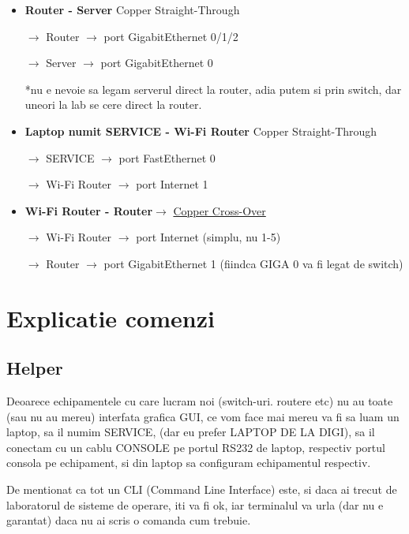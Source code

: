 \documentclass{article}
\begin{document}
\begin{itemize}
    

    



   
    \item \textbf{Router - Server} Copper Straight-Through

    $\rightarrow$ Router $\rightarrow$ port GigabitEthernet 0/1/2

    $\rightarrow$ Server $\rightarrow$ port GigabitEthernet 0

     *nu e nevoie sa legam serverul direct la router, adia putem si prin switch, dar uneori la lab se cere direct la router.

    \item \textbf{Laptop numit SERVICE - Wi-Fi Router} Copper Straight-Through

    $\rightarrow$ SERVICE $\rightarrow$ port FastEthernet 0

    $\rightarrow$ Wi-Fi Router $\rightarrow$ port Internet 1

    \item \textbf{Wi-Fi Router - Router}$\rightarrow$ \underline{Copper Cross-Over}

    $\rightarrow$ Wi-Fi Router $\rightarrow$ port Internet (simplu, nu 1-5)

    $\rightarrow$ Router $\rightarrow$ port GigabitEthernet 1 (fiindca GIGA 0 va fi legat de switch)
\end{itemize}

\section{Explicatie comenzi}



\subsection{Helper}
Deoarece echipamentele cu care lucram noi (switch-uri. routere etc) nu au toate (sau nu au mereu) interfata grafica GUI, ce vom face mai mereu va fi sa luam un laptop, sa il numim SERVICE, (dar eu prefer LAPTOP DE LA DIGI), sa il conectam cu un cablu CONSOLE pe portul RS232 de laptop, respectiv portul consola pe echipament, si din laptop sa configuram echipamentul respectiv.

De mentionat ca tot un CLI (Command Line Interface) este, si daca ai trecut de laboratorul de sisteme de operare, iti va fi ok, iar terminalul va urla (dar nu e garantat) daca nu ai scris o comanda cum trebuie.
\end{document}
